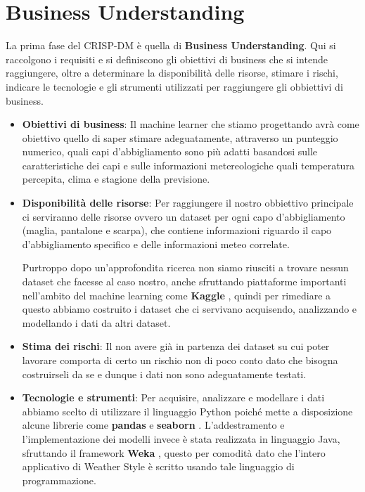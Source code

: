 \documentclass[a4paper, 11pt, oneside]{report}
\begin{document}
            \section{Business Understanding}
            La prima fase del CRISP-DM è quella di \textbf{Business Understanding}.
            Qui si raccolgono i requisiti e si definiscono gli obiettivi di business che si intende raggiungere, oltre a
            determinare la disponibilità delle risorse, stimare i rischi, indicare le tecnologie e gli strumenti utilizzati
            per raggiungere gli obbiettivi di business.
            \par \noindent
            \begin{itemize}
                \item \textbf{Obiettivi di business}: Il machine learner che stiamo progettando avrà come obiettivo quello di
                saper stimare adeguatamente, attraverso un punteggio numerico, quali capi d'abbigliamento sono più adatti basandosi
                sulle caratteristiche dei capi e sulle informazioni metereologiche quali temperatura percepita, clima e
                stagione della previsione.
                \item \textbf{Disponibilità delle risorse}: Per raggiungere il nostro obbiettivo principale ci serviranno
                delle risorse ovvero un dataset per ogni capo d'abbigliamento (maglia, pantalone e scarpa),
                che contiene informazioni riguardo il capo d'abbigliamento specifico e delle informazioni meteo correlate.
                \par \noindent Purtroppo dopo un'approfondita ricerca non siamo riusciti a trovare nessun dataset che facesse
                al caso nostro, anche sfruttando piattaforme importanti nell'ambito del machine learning come \textbf{Kaggle} \cite{3},
                quindi per rimediare a questo abbiamo costruito i dataset che ci servivano acquisendo, analizzando e modellando
                i dati da altri dataset.
                \item \textbf{Stima dei rischi}: Il non avere già in partenza dei dataset su cui poter lavorare comporta
                di certo un rischio non di poco conto dato che bisogna costruirseli da se e dunque i dati non sono adeguatamente testati.
                \item \textbf{Tecnologie e strumenti}: Per acquisire, analizzare e modellare i dati abbiamo scelto di utilizzare
                il linguaggio Python poiché mette a disposizione alcune librerie come \textbf{pandas} \cite{4} e \textbf{seaborn} \cite{5}.
                L'addestramento e l'implementazione dei modelli invece è stata realizzata in linguaggio Java,
                sfruttando il framework \textbf{Weka} \cite{2}, questo per comodità dato che l'intero applicativo di Weather Style
                è scritto usando tale linguaggio di programmazione.
            \end{itemize}
\end{document}
